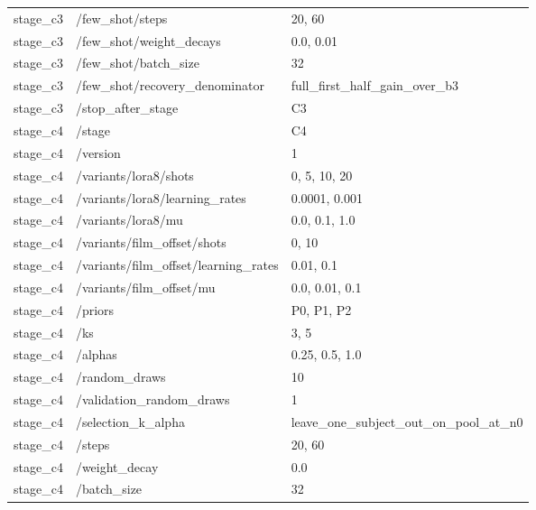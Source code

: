 \begin{longtable}{p{.65in}p{2.8in}p{3.2in}}
stage\_\allowbreak{}c3 & /few\_\allowbreak{}shot/steps & 20, 60 \\
stage\_\allowbreak{}c3 & /few\_\allowbreak{}shot/weight\_\allowbreak{}decays & 0.0, 0.01 \\
stage\_\allowbreak{}c3 & /few\_\allowbreak{}shot/batch\_\allowbreak{}size & 32 \\
stage\_\allowbreak{}c3 & /few\_\allowbreak{}shot/recovery\_\allowbreak{}denominator & full\_\allowbreak{}first\_\allowbreak{}half\_\allowbreak{}gain\_\allowbreak{}over\_\allowbreak{}b3 \\
stage\_\allowbreak{}c3 & /stop\_\allowbreak{}after\_\allowbreak{}stage & C3 \\
stage\_\allowbreak{}c4 & /stage & C4 \\
stage\_\allowbreak{}c4 & /version & 1 \\
stage\_\allowbreak{}c4 & /variants/lora8/shots & 0, 5, 10, 20 \\
stage\_\allowbreak{}c4 & /variants/lora8/learning\_\allowbreak{}rates & 0.0001, 0.001 \\
stage\_\allowbreak{}c4 & /variants/lora8/mu & 0.0, 0.1, 1.0 \\
stage\_\allowbreak{}c4 & /variants/film\_\allowbreak{}offset/shots & 0, 10 \\
stage\_\allowbreak{}c4 & /variants/film\_\allowbreak{}offset/learning\_\allowbreak{}rates & 0.01, 0.1 \\
stage\_\allowbreak{}c4 & /variants/film\_\allowbreak{}offset/mu & 0.0, 0.01, 0.1 \\
stage\_\allowbreak{}c4 & /priors & P0, P1, P2 \\
stage\_\allowbreak{}c4 & /ks & 3, 5 \\
stage\_\allowbreak{}c4 & /alphas & 0.25, 0.5, 1.0 \\
stage\_\allowbreak{}c4 & /random\_\allowbreak{}draws & 10 \\
stage\_\allowbreak{}c4 & /validation\_\allowbreak{}random\_\allowbreak{}draws & 1 \\
stage\_\allowbreak{}c4 & /selection\_\allowbreak{}k\_\allowbreak{}alpha & leave\_\allowbreak{}one\_\allowbreak{}subject\_\allowbreak{}out\_\allowbreak{}on\_\allowbreak{}pool\_\allowbreak{}at\_\allowbreak{}n0 \\
stage\_\allowbreak{}c4 & /steps & 20, 60 \\
stage\_\allowbreak{}c4 & /weight\_\allowbreak{}decay & 0.0 \\
stage\_\allowbreak{}c4 & /batch\_\allowbreak{}size & 32 \\

\end{longtable}
